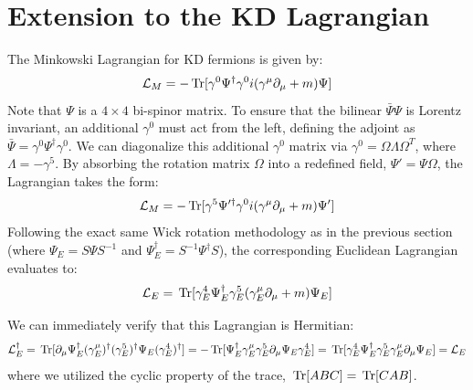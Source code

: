 \section{Extension to the KD Lagrangian}\label{sec:extend_KD}


The Minkowski Lagrangian for KD fermions is given by: 
\[
\mathcal{L}_M=-\,{\rm Tr}[\gamma^0\Psi^\dagger \gamma^0 i (\gamma^\mu\partial_\mu +m)\Psi]
\]
Note that $\Psi$ is a $4\times 4$ bi-spinor matrix. To ensure that the bilinear $\bar\Psi\Psi$ is Lorentz invariant, an additional $\gamma^0$ must act from the left, defining the adjoint as $\bar{\Psi}=\gamma^0\Psi^\dagger \gamma^0$. We can diagonalize this additional $\gamma^0$ matrix via $\gamma^0=\Omega \Lambda\Omega^T$, where $\Lambda=-\gamma^5$. By absorbing the rotation matrix $\Omega$ into a redefined field, $\Psi'=\Psi\Omega$, the Lagrangian takes the form: 
\[
\mathcal{L}_M=-\,{\rm Tr}[\gamma^5\Psi'^\dagger \gamma^0 i (\gamma^\mu\partial_\mu +m)\Psi']
\]
Following the exact same Wick rotation methodology as in the previous section (where $\Psi_E=S\Psi S^{-1}$ and $\Psi_E^\dagger=S^{-1}\Psi^\dagger S$), the corresponding Euclidean Lagrangian evaluates to:
\begin{equation}\label{eq:Euclidean_KD_Lagrangian}
    \mathcal{L}_E=\,{\rm Tr}[\gamma_E^4\Psi_E^\dagger \gamma_E^5(\gamma_E^\mu\partial_\mu +m)\Psi_E]
\end{equation}

We can immediately verify that this Lagrangian is Hermitian: 
\[\mathcal{L}_E^\dagger=\,{\rm Tr}[ \partial_\mu\Psi_E^\dagger(\gamma_E^\mu)^\dagger(\gamma_E^5)^\dagger\Psi_E(\gamma_E^4)^\dagger]=-\,{\rm Tr}[\Psi_E^\dagger\gamma_E^\mu \gamma_E^5\partial_\mu\Psi_E \gamma_E^4]=\,{\rm Tr}[\gamma_E^4\Psi_E^\dagger \gamma_E^5\gamma_E^\mu\partial_\mu\Psi_E]=\mathcal{L}_E\]
where we utilized the cyclic property of the trace, $\,{\rm Tr}[ABC]=\,{\rm Tr}[CAB]$.


